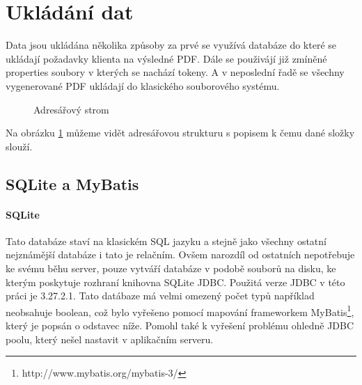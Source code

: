 \section{Ukládání dat}
Data jsou ukládána několika způsoby za prvé se využívá databáze do které se ukládají požadavky klienta na výsledné PDF. Dále se použivájí již zmíněné properties soubory v kterých se nachází tokeny. A v neposlední řadě se všechny vygenerované PDF ukládají do klasického souborového systému. 
\begin{figure}[H]
	\centering
	\begin{minipage}{15cm}
	\end{minipage}
	\caption{Adresářový strom}
	\label{fig:dirs}
\end{figure}
Na obrázku \ref{fig:dirs} můžeme vidět adresářovou strukturu s popisem k čemu dané složky slouží. 

\subsection{SQLite a MyBatis} \label{sqlite}
\paragraph{SQLite}
Tato databáze staví na klasickém SQL jazyku a stejně jako všechny ostatní nejznámější databáze i tato je relačním. Ovšem narozdíl od ostatních nepotřebuje ke svému běhu server, pouze vytváří databáze v podobě souborů na disku, ke kterým poskytuje rozhraní knihovna SQLite JDBC. Použitá verze JDBC v této práci je 3.27.2.1. Tato datábaze má velmi omezený počet typů například neobsahuje boolean, což bylo vyřešeno pomocí mapování frameworkem MyBatis\footnote{http://www.mybatis.org/mybatis-3/}, který je popsán o odstavec níže. Pomohl také k vyřešení problému ohledně JDBC poolu, který nešel nastavit v aplikačním serveru.


